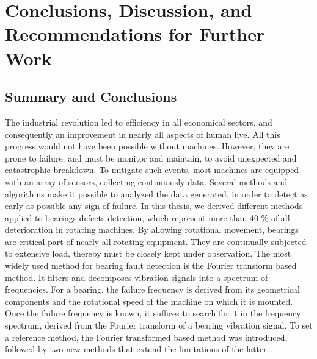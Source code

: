 \documentclass[thesis.tex]{subfiles}
\begin{document}
	\chapter[Conclusions]{Conclusions, Discussion, and Recommendations for Further Work}
	\label{ch:conclusions}
	
	\section{Summary and Conclusions}
	\label{sec:summary_and_conclusions}
	The industrial revolution led to efficiency in all economical sectors, and consequently an improvement in nearly all aspects of human live. All this progress would not have been possible without machines. However, they are prone to failure, and must be monitor and maintain, to avoid unexpected and catastrophic breakdown. To mitigate such events, most machines are equipped with an array of sensors, collecting continuously data. Several methods and algorithms make it possible to analyzed the data generated, in order to detect as early as possible any sign of failure.
	\justify
	In this thesis, we derived different methods applied to bearings defects detection, which represent more than 40 $\%$ of all deterioration in rotating machines. By allowing rotational movement, bearings are critical part of nearly all rotating equipment. They are continually subjected to extensive load, thereby must be closely kept under observation. The most widely used method for bearing fault detection is the Fourier transform based method. It filters and decomposes vibration signals into a spectrum of frequencies. For a bearing, the failure frequency is derived from its geometrical components and the rotational speed of the machine on which it is mounted. Once the failure frequency is known, it suffices to search for it in the frequency spectrum, derived from the Fourier transform of a bearing vibration signal. To set a reference method, the Fourier transformed based method was introduced, followed by two new methods that extend the limitations of the latter.
\end{document}
